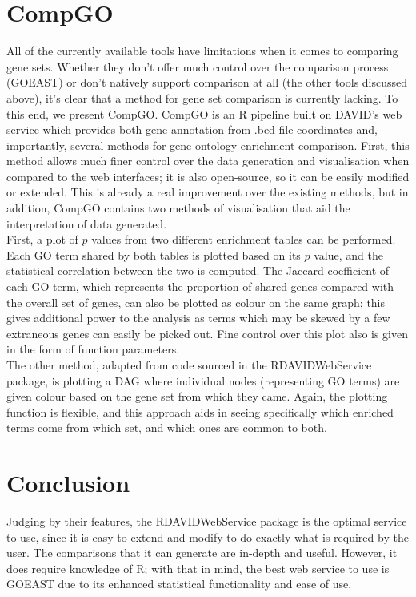 \documentclass[11pt, oneside]{article}
\begin{document}
\section*{CompGO}
All of the currently available tools have limitations when it comes to comparing gene sets. Whether they don't offer much control over the comparison process (GOEAST) or don't natively support comparison at all (the other tools discussed above), it's clear that a method for gene set comparison is currently lacking. To this end, we present CompGO. CompGO is an R pipeline built on DAVID's web service which provides both gene annotation from .bed file coordinates and, importantly, several methods for gene ontology enrichment comparison. First, this method allows much finer control over the data generation and visualisation when compared to the web interfaces; it is also open-source, so it can be easily modified or extended. This is already a real improvement over the existing methods, but in addition, CompGO contains two methods of visualisation that aid the interpretation of data generated.\\
First, a plot of $p$ values from two different enrichment tables can be performed. Each GO term shared by both tables is plotted based on its $p$ value, and the statistical correlation between the two is computed. The Jaccard coefficient of each GO term, which represents the proportion of shared genes compared with the overall set of genes, can also be plotted as colour on the same graph; this gives additional power to the analysis as terms which may be skewed by a few extraneous genes can easily be picked out. Fine control over this plot also is given in the form of function parameters.\\
The other method, adapted from code sourced in the RDAVIDWebService package, is plotting a DAG where individual nodes (representing GO terms) are given colour based on the gene set from which they came. Again, the plotting function is flexible, and this approach aids in seeing specifically which enriched terms come from which set, and which ones are common to both.

\section*{Conclusion}
Judging by their features, the RDAVIDWebService package is the optimal service to use, since it is easy to extend and modify to do exactly what is required by the user. The comparisons that it can generate are in-depth and useful. However, it does require knowledge of R; with that in mind, the best web service to use is GOEAST due to its enhanced statistical functionality and ease of use. 
\end{document}
